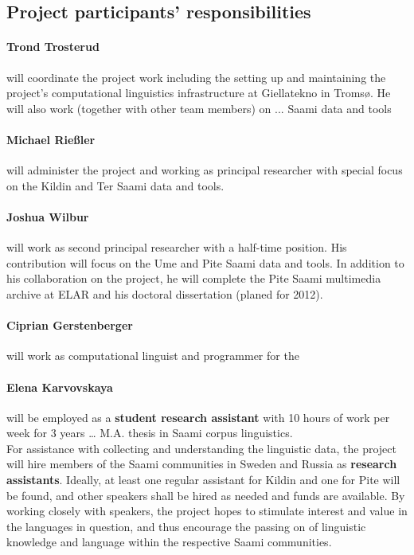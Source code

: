 \documentclass[a4paper,12pt]{article}
\begin{document}
{{{{\subsection{Project participants' responsibilities}

\paragraph{Trond Trosterud} will coordinate the project work including the setting up and maintaining the project's computational linguistics infrastructure at Giellatekno in Tromsø. He will also work (together with other team members) on ... Saami data and tools%

\paragraph{Michael Rießler} will administer the project and working as principal researcher with special focus on the Kildin and Ter Saami data and tools.%

\paragraph{Joshua Wilbur} will work as second principal researcher with a half-time position. His contribution will focus on the Ume and Pite Saami data and tools. In addition to his collaboration on the project, he will complete the Pite Saami multimedia archive at ELAR and his doctoral dissertation (planed for 2012).

\paragraph{Ciprian Gerstenberger} will work as computational linguist and programmer for the 

\paragraph{Elena Karvovskaya} will be employed as a \textbf{student research assistant} with 10 hours of work per week for 3 years … M.A. thesis in Saami corpus linguistics.\\

For assistance with collecting and understanding the linguistic data, the project will hire members of the Saami communities in Sweden and Russia as \textbf{research assistants}. %
Ideally, at least one regular assistant for Kildin and one for Pite will be found, and other speakers shall be hired as needed and funds are available. By working closely with speakers, the project hopes to stimulate interest and value in the languages in question, and thus encourage the passing on of linguistic knowledge and language within the respective Saami communities.

}}}}
\end{document}
